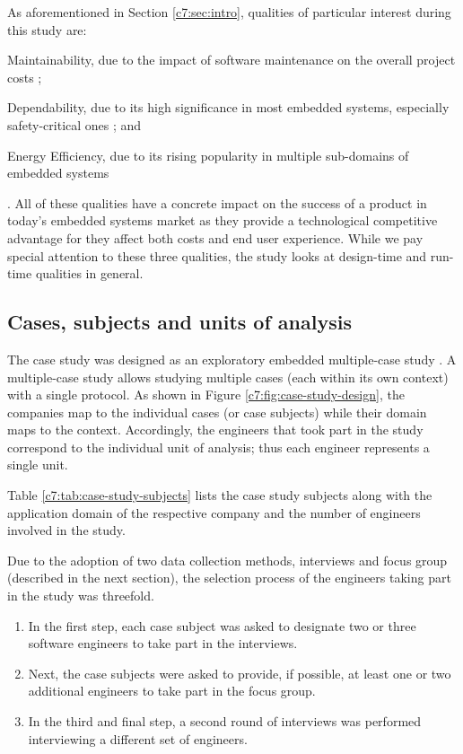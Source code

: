 As aforementioned in Section \ref{c7:sec:intro}, qualities of particular interest during this study are:
\begin{inlinelist}\item Maintainability, due to the impact of software maintenance on the overall project costs \cite{Erlikh2000}; \item Dependability, due to its high significance in most embedded systems, especially safety-critical ones \cite{Knight2002}; and \item Energy Efficiency, due to its rising popularity in multiple sub-domains of embedded systems \cite{Koopman2004} \end{inlinelist}.
All of these qualities have a concrete impact on the success of a product in today's embedded systems market as they provide a technological competitive advantage for they affect both costs and end user experience.
While we pay special attention to these three qualities, the study looks at design-time and run-time qualities in general. 

\subsection{Cases, subjects and units of analysis}
The case study was designed as an exploratory embedded multiple-case study \cite{Runeson2012}.
A multiple-case study allows studying multiple cases (each within its own context) with a single protocol.
As shown in Figure \ref{c7:fig:case-study-design}, the companies map to the individual cases (or case subjects) while their domain maps to the context.
Accordingly, the engineers that took part in the study correspond to the individual unit of analysis; thus each engineer represents a single unit.

Table \ref{c7:tab:case-study-subjects} lists the case study subjects along with the application domain of the respective company and the number of engineers involved in the study.

Due to the adoption of two data collection methods, interviews and focus group (described in the next section),  the selection process of the engineers taking part in the study was threefold.
\begin{enumerate}
    \item In the first step, each case subject was asked to designate two or three software engineers to take part in the interviews.
    \item Next, the case subjects were asked to provide, if possible, at least one or two additional engineers to take part in the focus group.
    \item In the third and final step, a second round of interviews was performed interviewing a different set of engineers.
\end{enumerate}

